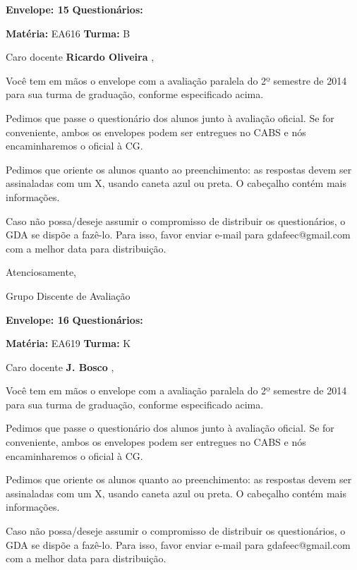 \documentclass[a5paper]{letter}
\begin{document}
\vspace{0.5cm}

{\bf Envelope: 15 }		\hfill	{\bf Questionários:} \hspace{2cm}

\newpage
\thispagestyle{empty}

\hfill {\bf Matéria:} EA616 {\bf Turma:} B

Caro docente {\bf Ricardo Oliveira }, 

	Você tem em mãos o envelope com a avaliação paralela do 2º semestre de 2014 para sua turma de graduação, conforme especificado acima.

	Pedimos que passe o questionário dos alunos junto à avaliação oficial. Se for conveniente, ambos os envelopes podem ser entregues no CABS e nós encaminharemos o oficial à CG.

Pedimos que oriente os alunos quanto ao preenchimento: as respostas devem ser assinaladas com um X, usando caneta azul ou preta. O cabeçalho contém mais informações.

	Caso não possa/deseje assumir o compromisso de distribuir os questionários, o GDA se dispõe a fazê-lo. Para isso, favor enviar e-mail para gdafeec@gmail.com com a melhor data para distribuição.


Atenciosamente, 

Grupo Discente de Avaliação

\vspace{0.5cm}

{\bf Envelope: 16 }		\hfill	{\bf Questionários:} \hspace{2cm}

\newpage
\thispagestyle{empty}

\hfill {\bf Matéria:} EA619 {\bf Turma:} K

Caro docente {\bf J. Bosco }, 

	Você tem em mãos o envelope com a avaliação paralela do 2º semestre de 2014 para sua turma de graduação, conforme especificado acima.

	Pedimos que passe o questionário dos alunos junto à avaliação oficial. Se for conveniente, ambos os envelopes podem ser entregues no CABS e nós encaminharemos o oficial à CG.

Pedimos que oriente os alunos quanto ao preenchimento: as respostas devem ser assinaladas com um X, usando caneta azul ou preta. O cabeçalho contém mais informações.

	Caso não possa/deseje assumir o compromisso de distribuir os questionários, o GDA se dispõe a fazê-lo. Para isso, favor enviar e-mail para gdafeec@gmail.com com a melhor data para distribuição.
\end{document}
